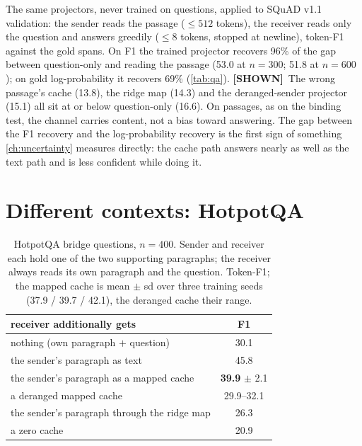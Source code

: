 \documentclass[11pt,a4paper]{report}
\newcommand{\SHOWN}{\textcolor{shownc}{\textbf{\scriptsize[SHOWN]}}}
\begin{document}
The same projectors, never trained on questions, applied to SQuAD v1.1 validation: the sender reads the passage ($\le 512$ tokens), the receiver reads only the question and answers greedily ($\le 8$ tokens, stopped at newline), token-F1 against the gold spans. On F1 the trained projector recovers 96\% of the gap between question-only and reading the passage (53.0 at $n = 300$; 51.8 at $n = 600$); on gold log-probability it recovers 69\% (\cref{tab:qa}). \SHOWN\ The wrong passage's cache (13.8), the ridge map (14.3) and the deranged-sender projector (15.1) all sit at or below question-only (16.6). On passages, as on the binding test, the channel carries content, not a bias toward answering. The gap between the F1 recovery and the log-probability recovery is the first sign of something \cref{ch:uncertainty} measures directly: the cache path answers nearly as well as the text path and is less confident while doing it.

\section{Different contexts: HotpotQA}

\begin{table}[h]
\caption{HotpotQA bridge questions, $n = 400$. Sender and receiver each hold one of the two supporting paragraphs; the receiver always reads its own paragraph and the question. Token-F1; the mapped cache is mean $\pm$ sd over three training seeds (37.9 / 39.7 / 42.1), the deranged cache their range.}
\label{tab:hotpot}
\vskip 0.1in
\begin{center}
\begin{small}
\begin{tabular}{lc}
\toprule
receiver additionally gets & F1 \\
\midrule
nothing (own paragraph $+$ question)        & 30.1 \\
the sender's paragraph as text              & 45.8 \\
the sender's paragraph as a mapped cache    & \textbf{39.9} $\pm$ 2.1 \\
a deranged mapped cache                     & 29.9--32.1 \\
the sender's paragraph through the ridge map & 26.3 \\
a zero cache                                & 20.9 \\
\bottomrule
\end{tabular}
\end{small}
\end{center}
\end{table}
\end{document}

